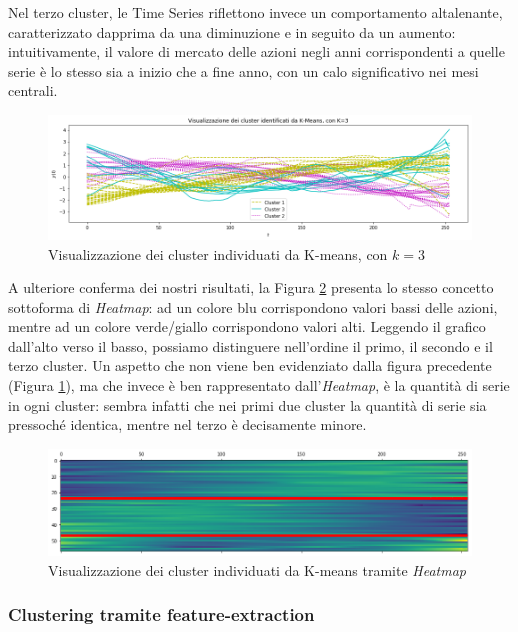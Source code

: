 \documentclass[a4paper]{article}
\begin{document}
Nel terzo cluster, le Time Series riflettono invece un comportamento altalenante, caratterizzato dapprima da una diminuzione e in seguito da un aumento: intuitivamente, il valore di mercato delle azioni negli anni corrispondenti a quelle serie è lo stesso sia a inizio che a fine anno, con un calo significativo nei mesi centrali.

\begin{figure}[h]
\includegraphics[width=\textwidth]{images/cluster_visualization.png}
\caption{Visualizzazione dei cluster individuati da K-means, con $k=3$}
\label{fig:cluster_visualization}
\end{figure}

A ulteriore conferma dei nostri risultati, la Figura \ref{fig:cluster_heatmap} presenta lo stesso concetto sottoforma di \textit{Heatmap}: ad un colore blu corrispondono valori bassi delle azioni, mentre ad un colore verde/giallo corrispondono valori alti. Leggendo il grafico dall'alto verso il basso, possiamo distinguere nell'ordine il primo, il secondo e il terzo cluster. Un aspetto che non viene ben evidenziato dalla figura precedente (Figura \ref{fig:cluster_visualization}), ma che invece è ben rappresentato dall'\textit{Heatmap}, è la quantità di serie in ogni cluster: sembra infatti che nei primi due cluster la quantità di serie sia pressoché identica, mentre nel terzo è decisamente minore.

\begin{figure}[h]
\includegraphics[width=\textwidth]{images/matshow_clusters.png}
\caption{Visualizzazione dei cluster individuati da K-means tramite \textit{Heatmap}}
\label{fig:cluster_heatmap}
\end{figure}

\subsubsection{Clustering tramite feature-extraction}
\end{document}
